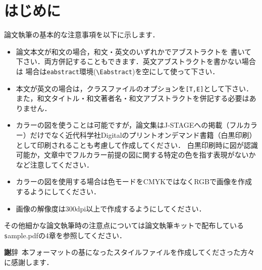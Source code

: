 \documentclass[T,J]{fose} %
\begin{document}
\section{はじめに}
論文執筆の基本的な注意事項を以下に示します．
\begin{itemize}
\item 論文本文が和文の場合，和文・英文のいずれかでアブストラクトを
書いて下さい．両方併記することもできます．英文アブストラクトを書かない場合は
場合は{\tt eabstract}環境(\verb|\Eabstract|)を空にして使って下さい．
\item 本文が英文の場合は，クラスファイルのオプションを{\verb|[T,E]|}として下さい．
また，和文タイトル・和文著者名・和文アブストラクトを併記する必要はありません．
\item カラーの図を使うことは可能ですが，論文集はJ-STAGEへの掲載（フルカラー）だけでなく近代科学社Digitalのプリントオンデマンド書籍（白黒印刷）として印刷されることも考慮して作成してください．
白黒印刷時に図が認識可能か，文章中でフルカラー前提の図に関する特定の色を指す表現がないかなど注意してください．
\item カラーの図を使用する場合は色モードをCMYKではなくRGBで画像を作成するようにしてください．
\item 画像の解像度は300dpi以上で作成するようにしてください．
\end{itemize}
その他細かな論文執筆時の注意点については論文執筆キットで配布している{\texttt sample.pdf}の4章を参照してください．

{\textbf 謝辞}\
本フォーマットの基になったスタイルファイルを作成してくださった方々に感謝します．





\end{document}
